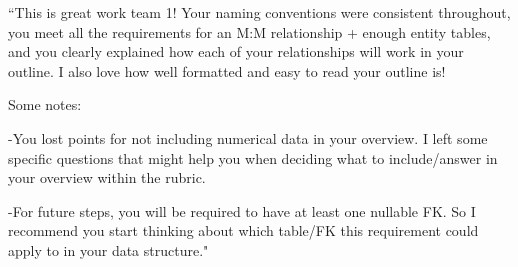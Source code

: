 \documentclass{article}
\begin{document}
\begin{tcolorbox}[colback=secondarycolor, colframe=primarycolor, title=\textbf{Step 1: TA Review - Madelyn Lazar}]
``This is great work team 1! Your naming conventions were consistent throughout, you meet all the requirements for an M:M relationship + enough entity tables, and you clearly explained how each of your relationships will work in your outline. I also love how well formatted and easy to read your outline is!

\vspace{0.2cm}

Some notes:

\vspace{0.2cm}

-You lost points for not including numerical data in your overview. I left some specific questions that might help you when deciding what to include/answer in your overview within the rubric.

\vspace{0.2cm}

-For future steps, you will be required to have at least one nullable FK. So I recommend you start thinking about which table/FK this requirement could apply to in your data structure."

\vspace{0.2cm}
\end{tcolorbox}

\vspace{0.5cm}
\end{document}
